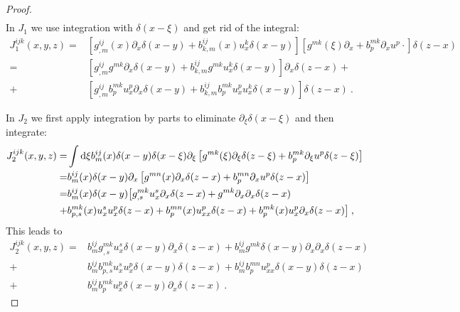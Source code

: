 \begin{proof}
\begin{align*}
    \end{align*}
    In $J_1$ we use integration with $\delta(x-\xi)$ and get rid of the integral:
    \begin{align*}
        J_1^{ijk}(x,y,z) =& \left[ g^{ij}_{,m}(x) \partial_x \delta(x-y) + b^{ij}_{k,m}(x) u^k_x \delta(x-y) \right] 
        \left[ g^{mk}(\xi) \partial_x + b^{mk}_p \partial_x u^p \cdot \right] \delta(z-x)
        \\
        =& \left[ g^{ij}_{,m} g^{mk} \partial_x \delta(x-y) + b^{ij}_{k,m} g^{mk} u^k_x \delta(x-y) \right] \partial_x \delta(z-x) + 
        \\
        +& \left[ g^{ij}_{,m} b^{mk}_p u^p_x \partial_x \delta(x-y) + b^{ij}_{k,m} b^{mk}_p u_x^p  u_x^k \delta(x-y) \right] \delta(z-x) \:.
    \end{align*}

    In $J_2$ we first apply integration by parts to eliminate $\partial_\xi \delta(x-\xi)$ and then integrate:
    \begin{align*}
        J_2^{ijk}(x,y,z) 
        =& \int \mathrm{d} \xi b^{ij}_m(x) \delta(x-y) \delta(x-\xi) \partial_\xi \left[ g^{mk}(\xi) \partial_\xi \delta(z-\xi) + b^{mk}_p \partial_\xi u^p \delta(z-\xi) \right]
        \\ =& b^{ij}_m(x) \delta(x-y) \partial_x \left[ g^{mn}(x) \partial_x \delta(z-x) + b^{mn}_p \partial_x u^p \delta(z-x) \right]
        \\ =& b^{ij}_m(x) \delta(x-y) \big[ g^{mk}_{,s} u^s_x \partial_x \delta (z-x) + g^{mk} \partial_x \partial_x \delta (z-x) 
        \\ +& b^{mk}_{p,s}(x) u^s_x u^p_x \delta (z-x) + b^{mn}_{p}(x) u^p_{xx} \delta (z-x) + b^{mk}_{p}(x) u^p_x \partial_x \delta (z-x) \big] \:,
    \end{align*}
    This leads to
    \begin{align*}
        J_2^{ijk}(x,y,z) =& b^{ij}_m g^{mk}_{,s} u^s_x \delta (x-y) \partial_x \delta (z-x) 
        + b^{ij}_m g^{mk} \delta(x-y) \partial_x \partial_x \delta (z-x) 
        \\ +& b^{ij}_m b^{mk}_{p,s} u^s_x u^p_x \delta (x-y) \delta (z-x)
        + b^{ij}_m b^{mn}_p u^p_{xx} \delta (x-y) \delta(z-x) 
        \\ +& b^{ij}_m b^{mk}_p u^p_x \delta(x-y) \partial_x \delta(z-x) \:.
    \end{align*}


\end{proof}

